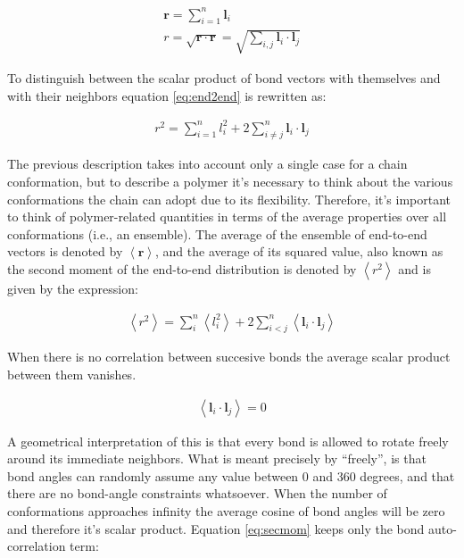 \begin{gather}
\label{eq:e2e}
\mathbf{r} = \sum_{i=1}^{n} \mathbf{l}_{i}\\
\label{eq:end2end}
r = \sqrt{\mathbf{r} \cdot \mathbf{r}}
  = \sqrt{\sum_{i,j}\mathbf{l}_{i} \cdot \mathbf{l}_{j}}
\end{gather}

To distinguish between the scalar product of bond vectors with
themselves and with their neighbors equation \ref{eq:end2end} is
rewritten as:

\begin{gather}
r^2 = \sum_{i=1}^{n}l_{i}^{2} + 2 \sum_{i\neq j}^{n}
\mathbf{l}_{i} \cdot \mathbf{l}_{j}
\end{gather}  

The previous description takes into account only a single case for a chain
conformation, but to describe a  polymer it's necessary to think about
the   various  conformations   the  chain   can  adopt   due   to  its
flexibility. Therefore,  it's  important to think  of polymer-related
quantities   in   terms   of   the   average   properties   over   all
conformations (i.e.,  an ensemble). The  average of the ensemble  of 
end-to-end vectors  is denoted by $\left< \mathbf{r}  \right>$, and the
average of its  squared value, also known as the  second moment of the
end-to-end  distribution is denoted  by $\left<  r^2 \right>$  and is
given by the expression:

\begin{gather}
\label{eq:secmom}  
\left<r^2\right>=\sum_{i}^{n}\left<l_{i}^2\right> +
2\sum_{i<j}^{n}\left<\mathbf{l}_{i} \cdot \mathbf{l}_{j}\right>
\end{gather}  

When there is no correlation between succesive bonds the average
scalar product between them vanishes.

\begin{gather}
\label{eq:nocorr}
\left<\mathbf{l}_{i} \cdot \mathbf{l}_{j}\right> = 0
\end{gather}

A geometrical interpretation of this  is that every bond is allowed to
rotate freely around its immediate neighbors.  What is meant precisely
by  ``freely'', is  that bond  angles  can randomly  assume any  value
between  0  and  360  degrees,   and  that  there  are  no  bond-angle
constraints whatsoever.   When the number  of conformations approaches
infinity the average cosine of  bond angles will be zero and therefore
it's  scalar product.   Equation \ref{eq:secmom} keeps  only the
bond auto-correlation term:

